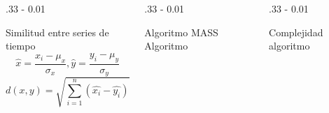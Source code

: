 \documentclass{iteraposter}\usepackage[]{graphicx}\usepackage[]{color}
\begin{document}
\begin{frame}

\begin{columns}[onlytextwidth]
  
  \begin{column}{.33 \textwidth - 0.01 \textwidth}
    \begin{block}{Similitud entre series de tiempo}
      \begin{equation}
        \hat{x} = \frac{x_{i}-\mu_{x}}{\sigma_{x}} , \hat{y} = \frac{y_{i}-\mu_{y}}{\sigma_{y}}
      \end{equation}
      \begin{equation}
        d(x,y) = \sqrt{\sum_{i=1}^{n}(\hat{x_{i}} -\hat{y_{i}})^{2})}
      \end{equation}
      \end{block}
  \end{column}

  \begin{column}{.33 \textwidth - 0.01 \textwidth}
    \begin{block}{Algoritmo MASS}
      Algoritmo
    \end{block}
  \end{column}
  
  \begin{column}{.33 \textwidth - 0.01 \textwidth}
    \begin{block}{Complejidad}
      algoritmo
    \end{block}
  \end{column}

\end{columns}


\begin{columns}[onlytextwidth]
  

\end{columns}
\end{frame}
\end{document}
